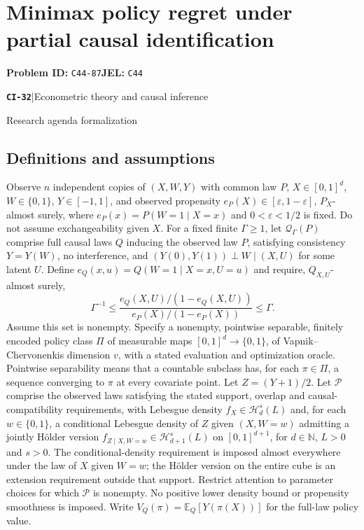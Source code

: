 \documentclass[11pt,a4paper]{article}
\newcommand{\E}{\mathbb E}
\newcommand{\N}{\mathbb N}
\newcommand{\entrymeta}[3]{{\sffamily\small\color{muted}\textbf{\texttt{#1}}\quad|\quad #2\par #3\par}}
\begin{document}
\section*{Minimax policy regret under partial causal identification}
\textbf{Problem ID:} \texttt{C44-87}\quad \textbf{JEL:} \texttt{C44}\par
\label{problem:OP-0511}
\label{beyond:CI-32}
\entrymeta{CI-32}{Econometric theory and causal inference}{Research agenda formalization}
\subsection*{Definitions and assumptions}
Observe $n$ independent copies of $(X,W,Y)$ with common law $P$, $X\in[0,1]^d$, $W\in\{0,1\}$, $Y\in[-1,1]$, and observed propensity $e_P(X)\in[\varepsilon,1-\varepsilon]$, $P_X$-almost surely, where $e_P(x)=P(W=1\mid X=x)$ and $0<\varepsilon<1/2$ is fixed. Do not assume exchangeability given $X$. For a fixed finite $\Gamma\geq1$, let $\mathcal Q_\Gamma(P)$ comprise full causal laws $Q$ inducing the observed law $P$, satisfying consistency $Y=Y(W)$, no interference, and $(Y(0),Y(1))\perp W\mid(X,U)$ for some latent $U$. Define $e_Q(x,u)=Q(W=1\mid X=x,U=u)$ and require, $Q_{X,U}$-almost surely,
\[
 \Gamma^{-1}\leq
 \frac{e_Q(X,U)/(1-e_Q(X,U))}{e_P(X)/(1-e_P(X))}
 \leq\Gamma.
\]
Assume this set is nonempty. Specify a nonempty, pointwise separable, finitely encoded policy class $\Pi$ of measurable maps $[0,1]^d\to\{0,1\}$, of Vapnik--Chervonenkis dimension $v$, with a stated evaluation and optimization oracle. Pointwise separability means that a countable subclass has, for each $\pi\in\Pi$, a sequence converging to $\pi$ at every covariate point. Let $Z=(Y+1)/2$. Let $\mathcal P$ comprise the observed laws satisfying the stated support, overlap and causal-compatibility requirements, with Lebesgue density $f_X\in\mathcal H_d^s(L)$ and, for each $w\in\{0,1\}$, a conditional Lebesgue density of $Z$ given $(X,W=w)$ admitting a jointly Hölder version $f_{Z\mid X,W=w}\in\mathcal H_{d+1}^s(L)$ on $[0,1]^{d+1}$, for $d\in\N$, $L>0$ and $s>0$. The conditional-density requirement is imposed almost everywhere under the law of $X$ given $W=w$; the Hölder version on the entire cube is an extension requirement outside that support. Restrict attention to parameter choices for which $\mathcal P$ is nonempty. No positive lower density bound or propensity smoothness is imposed. Write $V_Q(\pi)=\E_Q[Y(\pi(X))]$ for the full-law policy value.
\end{document}
